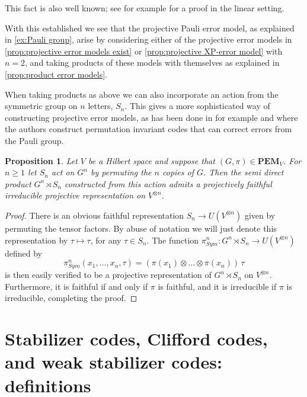 \documentclass[11pt, oneside, reqno]{amsart}
\newcommand{\PEM}{\mathbf{PEM}}
\theoremstyle{definition}
\theoremstyle{plain}
\newtheorem{proposition}[definition]{Proposition}
\theoremstyle{remark}
\begin{document}
This fact is also well known; see for example \cite[Theorem 10]{Serre77} for a proof in the linear setting.

With this established we see that the projective Pauli error model, as explained in \cref{ex:Pauli group}, arise by considering either of the projective error models in \cref{prop:projective error models exist} or \cref{prop:projective XP-error model} with $n = 2$, and taking products of these models with themselves as explained in \cref{prop:product error models}.

When taking products as above we can also incorporate an action from the symmetric group on $n$ letters, $S_n$. This gives a more sophisticated way of constructing projective error models, as has been done in for example \cite{Pollatsek-Ruskai04} and \cite{AydinAlekseyevBarg24} where the authors construct permutation invariant codes that can correct errors from the Pauli group.

\begin{proposition}\label{prop:permutation product PEM}
    Let $V$ be a Hilbert space and suppose that $(G,\pi) \in \PEM_V$. For $n \geq 1$ let $S_n$ act on $G^n$ by permuting the $n$ copies of $G$. Then the semi direct product $G^n \rtimes S_n$ constructed from this action admits a projectively faithful irreducible projective representation on $V^{\otimes n}$.
\end{proposition}
\begin{proof}
    There is an obvious faithful representation $S_n \to U(V^{\otimes n})$ given by permuting the tensor factors. By abuse of notation we will just denote this representation by $\tau \mapsto \tau$, for any $\tau \in S_n$. The function $\pi^{n}_{Sym} \colon G^n \rtimes S_n \to U(V^{\otimes n})$ defined by
    \begin{equation*}
        \pi^{n}_{Sym}(x_1,\dots,x_n,\tau) 
        = (\pi(x_1) \otimes \dots \otimes \pi(x_n)) \, \tau
    \end{equation*}
    is then easily verified to be a projective representation of $G^n \rtimes S_n$ on $V^{\otimes n}$. Furthermore, it is faithful if and only if $\pi$ is faithful, and it is irreducible if $\pi$ is irreducible, completing the proof.
\end{proof}

\section{Stabilizer codes, Clifford codes, and weak stabilizer codes: definitions}\label{sec:codes}
\end{document}
